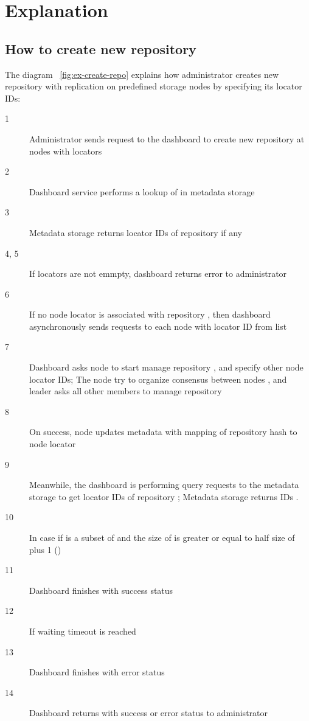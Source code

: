 \section{Explanation}
\label{sec:explanation}

\subsection{How to create new repository}

The diagram ~\ref{fig:ex-create-repo} explains how administrator creates new repository with replication
on predefined storage nodes by specifying its locator IDs:
\begin{description}
  \item[1] Administrator sends request to the dashboard to create new repository  at nodes with locators
  \item[2] Dashboard service performs a lookup of  in metadata storage
  \item[3] Metadata storage returns locator IDs  of  repository if any
  \item[4, 5] If  locators are not emmpty, dashboard returns error to administrator
  \item[6] If no node locator is associated with repository , then dashboard asynchronously sends
    requests to each node with locator ID  from list 
  \item[7] Dashboard asks node  to start manage repository , and specify other node locator IDs;
    The node  try to organize consensus between nodes , and leader asks all other members
    to manage repository 
  \item[8] On success, node  updates metadata with mapping of repository  hash to
    node locator 
  \item[9] Meanwhile, the dashboard is performing query requests to the metadata storage to get locator IDs of
    repository ; Metadata storage returns IDs .
  \item[10] In case if  is a subset of  and the size of  is greater or equal to
    half size of  plus 1 ()
  \item[11] Dashboard finishes with success status
  \item[12] If waiting timeout is reached
  \item[13] Dashboard finishes with error status
  \item[14] Dashboard returns with success or error status to administrator

\end{description}
